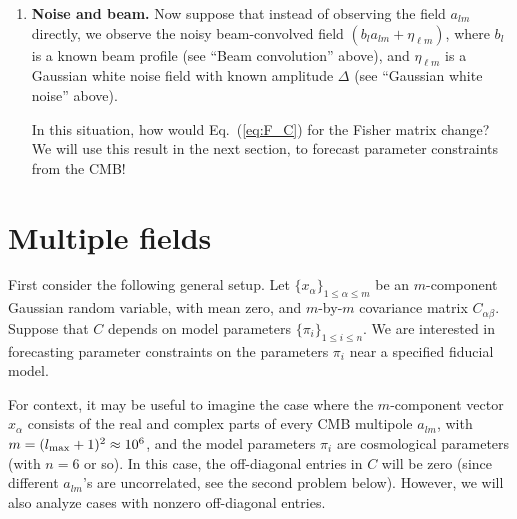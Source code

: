 \documentclass[aps,prd,superscriptaddress,groupedaddress,nofootinbib,nobibnotes]{revtex4}
\begin{document}
\begin{enumerate}
\item {\bf Noise and beam.}
 Now suppose that instead of observing the field $a_{lm}$ directly, we observe the noisy beam-convolved field $(b_l a_{lm} + \eta_{\ell m})$,
 where $b_l$ is a known beam profile (see ``Beam convolution'' above), and $\eta_{\ell m}$ is a Gaussian white noise field with known
 amplitude $\Delta$ (see ``Gaussian white noise'' above).

 In this situation, how would Eq.~(\ref{eq:F_C}) for the Fisher matrix change?
 We will use this result in the next section, to forecast parameter constraints from the CMB!

\end{enumerate}

\clearpage

\section{Multiple fields}

First consider the following general setup.  Let $\{ x_\alpha \}_{1\le \alpha\le m}$ be an $m$-component Gaussian random
variable, with mean zero, and $m$-by-$m$ covariance matrix $C_{\alpha\beta}$.  Suppose that $C$ depends on model parameters
$\{ \pi_i \}_{1\le i \le n}$.  We are interested in forecasting parameter constraints on the parameters $\pi_i$
near a specified fiducial model.

For context, it may be useful to imagine the case where the $m$-component vector $x_\alpha$ consists of the
real and complex parts of every CMB multipole $a_{lm}$, with $m = (l_{\rm max}+1)^2 \approx 10^6$, and the
model parameters $\pi_i$ are cosmological parameters (with $n=6$ or so).  In this case, the off-diagonal entries
in $C$ will be zero (since different $a_{lm}$'s are uncorrelated, see the second problem below).  However, we
will also analyze cases with nonzero off-diagonal entries.
\end{document}
